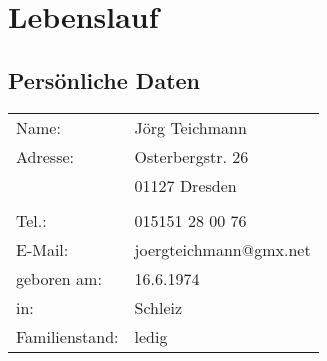 \documentclass{article}
\begin{document}

\section*{Lebenslauf}

\begin{flushright}
\end{flushright}

\subsection*{Pers\"onliche Daten}
\begin{tabular}{lp{15cm}}
Name: 		& J\"org Teichmann\\
Adresse: 	& Osterbergstr. 26\\
	 		& 01127 Dresden\\
\\
Tel.:		& 015151 28 00 76 \\
E-Mail:  	& joergteichmann@gmx.net \\
geboren am: & 16.6.1974\\
in:	    	& Schleiz\\
Familienstand: 	& ledig
\end{tabular}
\end{document}
